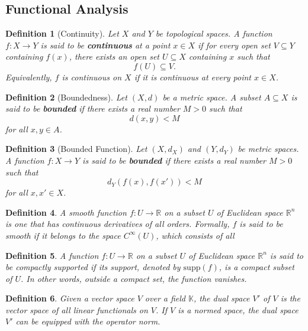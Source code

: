 \documentclass{article}
\newtheorem{definition}{Definition}[subsection]
\theoremstyle{definition}
\begin{document}
\subsection{Functional Analysis}
\begin{definition}[Continuity]
Let $X$ and $Y$ be topological spaces. A function $f: X \to Y$ is said to be \textbf{continuous} at a point $x \in X$ if for every open set $V \subseteq Y$ containing $f(x)$, there exists an open set $U \subseteq X$ containing $x$ such that
\[ f(U) \subseteq V. \]
Equivalently, $f$ is continuous on $X$ if it is continuous at every point $x \in X$.
\end{definition}

\begin{definition}[Boundedness]
Let $(X, d)$ be a metric space. A subset $A \subseteq X$ is said to be \textbf{bounded} if there exists a real number $M > 0$ such that
\[ d(x, y) < M \]
for all $x, y \in A$.
\end{definition}

\begin{definition}[Bounded Function]
Let $(X, d_X)$ and $(Y, d_Y)$ be metric spaces. A function $f: X \to Y$ is said to be \textbf{bounded} if there exists a real number $M > 0$ such that
\[ d_Y(f(x), f(x')) < M \]
for all $x, x' \in X$.
\end{definition}
\begin{definition}
    A smooth function $f: U \rightarrow \mathbb{R}$ on a subset $U$ of Euclidean space $\mathbb{R}^n$ is one that has continuous derivatives of all orders. Formally, $f$ is said to be smooth if it belongs to the space $C^\infty(U)$, which consists of all 
\end{definition}
\begin{definition}
    A function $f: U \rightarrow \mathbb{R}$ on a subset $U$ of Euclidean space $\mathbb{R}^n$ is said to be compactly supported if its support, denoted by $\text{supp}(f)$, is a compact subset of $U$. In other words, outside a compact set, the function vanishes.
\end{definition}

\begin{definition}
    Given a vector space $V$ over a field $\mathbb{K}$, the dual space $V'$ of $V$ is the vector space of all linear functionals on $V$. If $V$ is a normed space, the dual space $V'$ can be equipped with the operator norm.
\end{definition}
\end{document}
